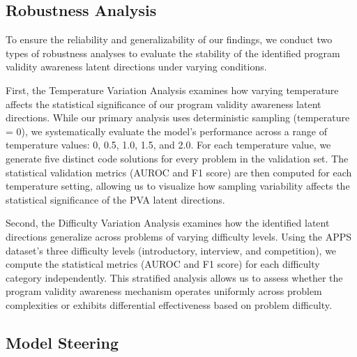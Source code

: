 \subsection{Robustness Analysis}

To ensure the reliability and generalizability of our findings, we conduct two types of robustness analyses to evaluate the stability of the identified program validity awareness latent directions under varying conditions.

First, the Temperature Variation Analysis examines how varying temperature affects the statistical significance of our program validity awareness latent directions. While our primary analysis uses deterministic sampling (temperature = 0), we systematically evaluate the model's performance across a range of temperature values: 0, 0.5, 1.0, 1.5, and 2.0. For each temperature value, we generate five distinct code solutions for every problem in the validation set. The statistical validation metrics (AUROC and F1 score) are then computed for each temperature setting, allowing us to visualize how sampling variability affects the statistical significance of the PVA latent directions.

Second, the Difficulty Variation Analysis examines how the identified latent directions generalize across problems of varying difficulty levels. Using the APPS dataset's three difficulty levels (introductory, interview, and competition), we compute the statistical metrics (AUROC and F1 score) for each difficulty category independently. This stratified analysis allows us to assess whether the program validity awareness mechanism operates uniformly across problem complexities or exhibits differential effectiveness based on problem difficulty.

\subsection{Model Steering}

